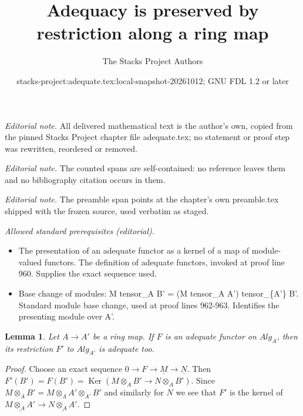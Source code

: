 \documentclass{stacks-project}
\title{Adequacy is preserved by restriction along a ring map}
\author{The Stacks Project Authors}
\date{stacks-project:adequate.tex:local-snapshot-20261012; GNU FDL 1.2 or later}
\theoremstyle{plain}
\newtheorem{lemma}[subsection]{Lemma}
\theoremstyle{definition}
\theoremstyle{remark}
\numberwithin{equation}{subsection}
\def\Ker{\mathop{\mathrm{Ker}}}
\begin{document}
\maketitle
\noindent\textit{Editorial note.} All delivered mathematical text is the author's own, copied from the pinned Stacks Project chapter file adequate.tex; no statement or proof step was rewritten, reordered or removed.\par\medskip
\noindent\textit{Editorial note.} The counted spans are self-contained: no reference leaves them and no bibliography citation occurs in them.\par\medskip
\noindent\textit{Editorial note.} The preamble span points at the chapter's own preamble.tex shipped with the frozen source, used verbatim as staged.\par\medskip
\noindent\textit{Allowed standard prerequisites (editorial).}\begin{itemize}
\item The presentation of an adequate functor as a kernel of a map of module-valued functors. The definition of adequate functors, invoked at proof line 960. Supplies the exact sequence used.
\item Base change of modules: M tensor\_A B' = (M tensor\_A A') tensor\_\{A'\} B'. Standard module base change, used at proof lines 962-963. Identifies the presenting module over A'.
\end{itemize}\medskip
\begin{lemma}
\label{lemma-base-change-adequate}
Let $A \to A'$ be a ring map. If $F$ is an adequate functor on
$\textit{Alg}_A$, then its restriction $F'$ to
$\textit{Alg}_{A'}$ is adequate too.
\end{lemma}

\begin{proof}
Choose an exact sequence $0 \to F \to \underline{M} \to \underline{N}$.
Then $F'(B') = F(B') = \Ker(M \otimes_A B' \to N \otimes_A B')$.
Since $M \otimes_A B' = M \otimes_A A' \otimes_{A'} B'$ and similarly
for $N$ we see that $F'$ is the kernel of
$\underline{M \otimes_A A'} \to \underline{N \otimes_A A'}$.
\end{proof}
\end{document}
